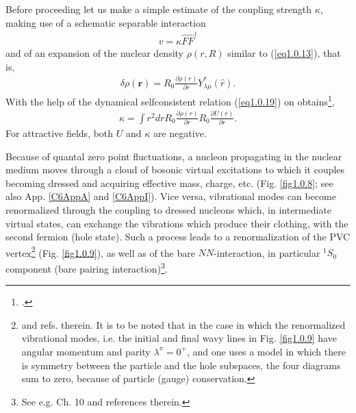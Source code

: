 Before proceeding let us make a simple estimate of the coupling strength $\kappa$, making use of a schematic separable interaction
\begin{align}\label{eq1.2.9}
v=\kappa\hat F\hat F^\dagger
\end{align}
and of an expansion of the nuclear density $\rho(r,R)$ similar to (\ref{eq1.0.13}), that is,
\begin{align}\label{eq1.2.10}
\delta\rho(\mathbf r)=R_0\frac{\partial\rho(r)}{\partial r} Y^*_{\lambda\mu}(\hat r).
\end{align}
With the help of the dynamical selfconsistent relation (\ref{eq1.0.19}) on obtains\footnote{\cite{Bohr:75}.},
\begin{align}\label{eq1.2.11}
\kappa=\int r^2 dr R_0\frac{\partial\rho(r)}{\partial r}R_0\frac{\partial U(r)}{\partial r}.
\end{align}
For attractive fields, both $U$ and $\kappa$ are negative.


Because of quantal zero point fluctuations, a nucleon propagating in the nuclear medium moves through a cloud of bosonic  virtual excitations to which it couples becoming dressed and acquiring  effective mass, charge, etc. (Fig. \ref{fig1.0.8}; see also App. \ref{C6AppA} and \ref{C6AppI}). Vice versa, vibrational modes can become renormalized through the coupling to dressed nucleons which, in intermediate virtual states, can exchange the vibrations which produce their clothing, with the second fermion (hole state). Such a process leads to a renormalization of the PVC vertex\footnote{\label{footnote7} \cite{Bertsch:83,Barranco:04} and refs. therein. It is to be noted that in the case in which the renormalized vibrational modes, i.e. the initial and final wavy lines in Fig. \ref{fig1.0.9} have angular momentum and parity $\lambda^\pi=0^+$, and one uses a model in which there is symmetry between the particle and the hole subspaces, the four diagrams sum to zero, because of particle (gauge) conservation.} (Fig. \ref{fig1.0.9}), as well as of the bare $NN$-interaction, in particular $^1S_0$ component (bare pairing interaction)\footnote{See e.g. \cite{Brink:05} Ch. 10 and references therein.}. 

